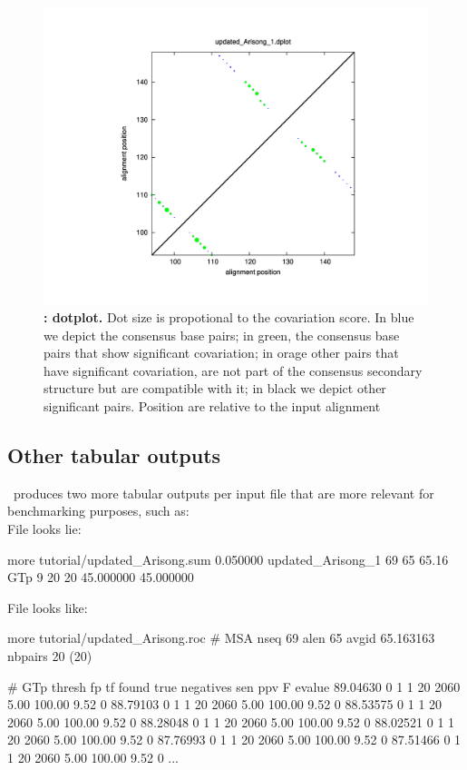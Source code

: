 \begin{figure}
  \includegraphics[scale=0.60]{Arisong_dplot.pdf}
\caption{\small\textbf{:
    dotplot.}  Dot size is propotional to the covariation score. In
  blue we depict the consensus base pairs; in green, the consensus
  base pairs that show significant covariation; in orage other pairs
  that have significant covariation, are not part of the consensus
  secondary structure but are compatible with it; in black we depict
  other significant pairs.  Position are relative to the input alignment}
\label{fig:dplot}
\end{figure}



\clearpage
\subsection{Other tabular outputs}

\rscape\ produces two more tabular outputs per input file that are
more relevant for benchmarking purposes, such as:\\

File  looks lie:

\begin{sreoutput}
more tutorial/updated_Arisong.sum 
0.050000        updated_Arisong_1       69      65      65.16    GTp 9 20 20 45.000000 45.000000 
\end{sreoutput}


File  looks like:
\begin{sreoutput}
more tutorial/updated_Arisong.roc
# MSA nseq 69 alen 65 avgid 65.163163 nbpairs 20 (20)

# GTp thresh fp tf found true negatives sen ppv F evalue
89.04630 0 1 1 20 2060 5.00 100.00 9.52 0
88.79103 0 1 1 20 2060 5.00 100.00 9.52 0
88.53575 0 1 1 20 2060 5.00 100.00 9.52 0
88.28048 0 1 1 20 2060 5.00 100.00 9.52 0
88.02521 0 1 1 20 2060 5.00 100.00 9.52 0
87.76993 0 1 1 20 2060 5.00 100.00 9.52 0
87.51466 0 1 1 20 2060 5.00 100.00 9.52 0
...
\end{sreoutput}
